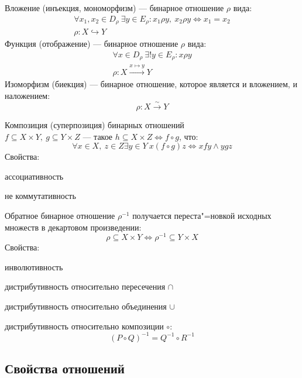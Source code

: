 {\bold Вложение} {\ital (инъекция, мономорфизм)} --- бинарное отношение $\rho$ вида:
$$\begin{gathered}
\forall x_1,x_2\in D_\rho\ \exists y\in E_\rho\colon x_1\rho y,\ x_2\rho y\iff x_1=x_2\\
\rho\colon X\hookrightarrow Y
\end{gathered}$$
{\bold Функция} {\ital (отображение)} --- бинарное отношение $\rho$ вида:
$$\begin{gathered}
\forall x\in D_\rho\ \exists!y\in E_\rho\colon x\rho y\\
\rho\colon X\xrightarrow{x\mapsto y} Y
\end{gathered}$$
{\bold Изоморфизм} {\ital (биекция)} --- бинарное отношение, которое является {\ital и вложением, и наложением}:
$$\rho\colon X\xrightarrow{\sim}Y$$
\begin{theorem}
{\bold Композиция} {\ital (суперпозиция)} бинарных отношений\\ $f\subseteq X\times Y,\ g\subseteq Y\times Z$ --- такое $h\subseteq X\times Z\iff f\circ g$, что:
$$\forall x\in X,\ z\in Z\exists y\in Y\ x(f\circ g)z\iff xfy\land ygz$$
Свойства:

\begin{list*}
\item ассоциативность
\item {\ital *не коммутативность}
\end{list*}
\end{theorem}

\begin{theorem}
{\bold Обратное} бинарное отношение $\rho^{-1}$ получается переста"=новкой исходных множеств в декартовом произведении:
$$\rho\subseteq X\times Y\iff\rho^{-1}\subseteq Y\times X$$
Свойства:
\begin{list*}
\item инволютивность
\item дистрибутивность относительно {\ital пересечения} $\cap$
\item дистрибутивность относительно {\ital объединения} $\cup$
\item дистрибутивность относительно {\ital композиции} $\circ$:
$$(P\circ Q)^{-1}=Q^{-1}\circ R^{-1}$$
\end{list*}
\end{theorem}

\subsection{Свойства отношений}

